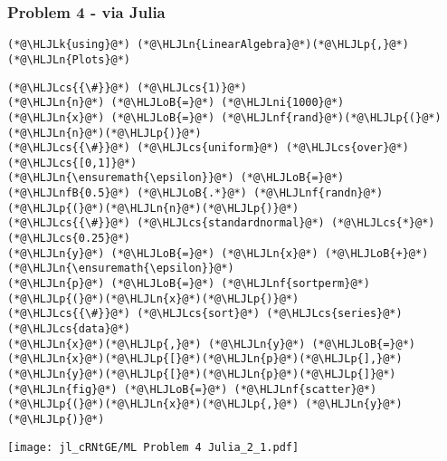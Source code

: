 \documentclass[12pt,a4paper]{article}
\newcommand{\HLJLk}[1]{\textcolor[RGB]{148,91,176}{\textbf{#1}}}
\newcommand{\HLJLn}[1]{#1}
\newcommand{\HLJLnf}[1]{\textcolor[RGB]{66,102,213}{#1}}
\newcommand{\HLJLnfB}[1]{\textcolor[RGB]{59,151,46}{#1}}
\newcommand{\HLJLni}[1]{\textcolor[RGB]{59,151,46}{#1}}
\newcommand{\HLJLoB}[1]{\textcolor[RGB]{102,102,102}{\textbf{#1}}}
\newcommand{\HLJLp}[1]{#1}
\newcommand{\HLJLcs}[1]{\textcolor[RGB]{153,153,119}{\textit{#1}}}
\begin{document}
\subsubsection{Problem 4 - via Julia}

\begin{lstlisting}
(*@\HLJLk{using}@*) (*@\HLJLn{LinearAlgebra}@*)(*@\HLJLp{,}@*) (*@\HLJLn{Plots}@*)
\end{lstlisting}


\begin{lstlisting}
(*@\HLJLcs{{\#}}@*) (*@\HLJLcs{1)}@*)
(*@\HLJLn{n}@*) (*@\HLJLoB{=}@*) (*@\HLJLni{1000}@*)
(*@\HLJLn{x}@*) (*@\HLJLoB{=}@*) (*@\HLJLnf{rand}@*)(*@\HLJLp{(}@*)(*@\HLJLn{n}@*)(*@\HLJLp{)}@*)                                 (*@\HLJLcs{{\#}}@*) (*@\HLJLcs{uniform}@*) (*@\HLJLcs{over}@*) (*@\HLJLcs{[0,1]}@*)
(*@\HLJLn{\ensuremath{\epsilon}}@*) (*@\HLJLoB{=}@*) (*@\HLJLnfB{0.5}@*) (*@\HLJLoB{.*}@*) (*@\HLJLnf{randn}@*)(*@\HLJLp{(}@*)(*@\HLJLn{n}@*)(*@\HLJLp{)}@*)                         (*@\HLJLcs{{\#}}@*) (*@\HLJLcs{standardnormal}@*) (*@\HLJLcs{*}@*) (*@\HLJLcs{0.25}@*)
(*@\HLJLn{y}@*) (*@\HLJLoB{=}@*) (*@\HLJLn{x}@*) (*@\HLJLoB{+}@*) (*@\HLJLn{\ensuremath{\epsilon}}@*)
(*@\HLJLn{p}@*) (*@\HLJLoB{=}@*) (*@\HLJLnf{sortperm}@*)(*@\HLJLp{(}@*)(*@\HLJLn{x}@*)(*@\HLJLp{)}@*)                             (*@\HLJLcs{{\#}}@*) (*@\HLJLcs{sort}@*) (*@\HLJLcs{series}@*) (*@\HLJLcs{data}@*)
(*@\HLJLn{x}@*)(*@\HLJLp{,}@*) (*@\HLJLn{y}@*) (*@\HLJLoB{=}@*) (*@\HLJLn{x}@*)(*@\HLJLp{[}@*)(*@\HLJLn{p}@*)(*@\HLJLp{],}@*) (*@\HLJLn{y}@*)(*@\HLJLp{[}@*)(*@\HLJLn{p}@*)(*@\HLJLp{]}@*)
(*@\HLJLn{fig}@*) (*@\HLJLoB{=}@*) (*@\HLJLnf{scatter}@*)(*@\HLJLp{(}@*)(*@\HLJLn{x}@*)(*@\HLJLp{,}@*) (*@\HLJLn{y}@*)(*@\HLJLp{)}@*)
\end{lstlisting}

\texttt{[image: jl\_cRNtGE/ML Problem 4 Julia\_2\_1.pdf]}
\end{document}
